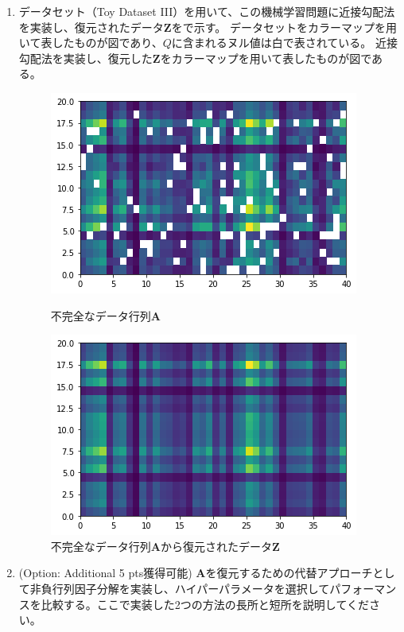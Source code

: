 \documentclass{jsarticle}
\begin{document}
\begin{enumerate}
  \item データセット（Toy Dataset III）を用いて、この機械学習問題に近接勾配法を実装し、復元されたデータ$\bm Z$をで示す。
  データセットをカラーマップを用いて表したものが図であり、$Q$に含まれるヌル値は白で表されている。
  近接勾配法を実装し、復元した$\bm Z$をカラーマップを用いて表したものが図である。
  \begin{figure}[htbp]
    \centering
    \begin{minipage}{0.49\linewidth}
      \centering
      \includegraphics[width=.9\textwidth]{image/5_0.png}
    \caption{不完全なデータ行列$\bm A$}
    \end{minipage}
    \begin{minipage}{0.49\linewidth}
      \centering
      \includegraphics[width=.9\textwidth]{image/5_1.png}
    \caption{不完全なデータ行列$\bm A$から復元されたデータ$\bm Z$}
    \end{minipage}
  \end{figure}

  \item (Option: Additional 5 pts獲得可能) $\bm A$を復元するための代替アプローチとして非負行列因子分解を実装し、ハイパーパラメータを選択してパフォーマンスを比較する。ここで実装した2つの方法の長所と短所を説明してください。
\end{enumerate}
　　
\end{document}
